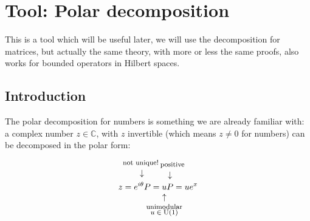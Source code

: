 \documentclass[../main.tex]{subfiles}
\begin{document}
\setchapterpreamble[u]{\margintoc}
\chapter[Tool: Polar decomposition]{Tool: Polar decomposition\footnotemark[0]}
This is a tool which will be useful later, we will use the decomposition for matrices, but actually the same theory, with more or less the same proofs, also works for bounded operators in Hilbert spaces.
\section{Introduction}
The polar decomposition for numbers is something we are already familiar with: a complex number $z\in\mathbb{C}$, with $z$ invertible (which means $z\neq 0$ for numbers) can be decomposed in the polar form:
\[
z=e^{i\overset{\mathclap{\tikz \node {$\downarrow$} node [above=1.25ex] {\footnotesize not unique!$\ $};}}{\theta}}P=\underset{\mathclap{\tikz \node {$\uparrow$} node [below=1ex] {\footnotesize \text{\parbox{3 cm}{\centering unimodular\\[-3pt] $u\in\textrm{U}(1)$}}};}}{u}\overset{\mathclap{\tikz \node {$\downarrow$} node [above=1.25ex] {\footnotesize $\ $ positive};}}{P}=ue^x
\]
\end{document}

